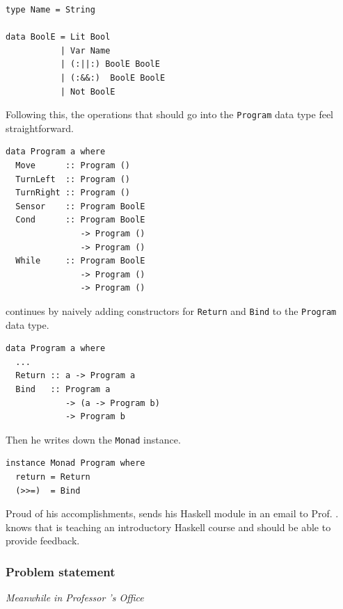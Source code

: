 \pagebreak
\begin{small} 
\begin{verbatim}
type Name = String

data BoolE = Lit Bool
           | Var Name
           | (:||:) BoolE BoolE
           | (:&&:)  BoolE BoolE
           | Not BoolE  
\end{verbatim} 
\end{small}  

Following this, the  operations that should go into the {\tt Program} data type 
feel straightforward.

\begin{small} 
\begin{verbatim}
data Program a where 
  Move      :: Program () 
  TurnLeft  :: Program () 
  TurnRight :: Program () 
  Sensor    :: Program BoolE
  Cond      :: Program BoolE 
               -> Program () 
               -> Program () 
  While     :: Program BoolE 
               -> Program () 
               -> Program () 
\end{verbatim} 
\end{small} 

\studname{} continues by naively adding constructors for {\tt Return} and 
{\tt Bind} to the {\tt Program} data type.   

\begin{small} 
\begin{verbatim}
data Program a where 
  ...
  Return :: a -> Program a 
  Bind   :: Program a 
            -> (a -> Program b)
            -> Program b 
\end{verbatim} 
\end{small} 

Then he writes down the {\tt Monad} instance.
 
\begin{small} 
\begin{verbatim}
instance Monad Program where 
  return = Return 
  (>>=)  = Bind 
\end{verbatim} 
\end{small} 

Proud of his accomplishments, \studname{} sends his Haskell module in an 
email to Prof. \docname{}. \studname{} knows that \docname{} is teaching an 
introductory Haskell course and should be able to provide feedback.



\subsubsection{Problem statement} 
\emph{Meanwhile in Professor \docname{}'s Office}\newline %

